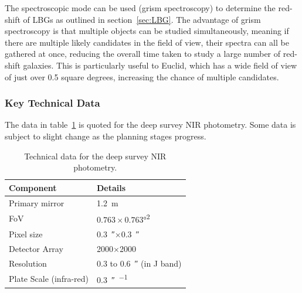 		The spectroscopic mode can be used (grism spectroscopy) to determine the red-shift of LBGs as outlined in section~\ref{sec:LBG}. The advantage of grism spectroscopy is that multiple objects can be studied simultaneously, meaning if there are multiple likely candidates in the field of view, their spectra can all be gathered at once, reducing the overall time taken to study a large number of red-shift galaxies. This is particularly useful to Euclid, which has a wide field of view of just over 0.5 square degrees, increasing the chance of multiple candidates.

	\subsubsection{Key Technical Data} %
	\label{ssub:key_technical_data}
		The data in table~\ref{tab:Euclid_technical} is quoted for the deep survey NIR photometry. Some data is subject to slight change as the planning stages progress.
		\begin{table}[ht]
			\begin{center}
				\begin{tabular}{l|l}
					Component & Details \\
					\hline\hline
					Primary mirror		& \SI{1.2}{\metre} \\ \hline
					FoV 				& $0.763\times0.763$\si{\degree\squared} \\ \hline
					Pixel size			& \SI{0.3}{\arcsecond}$\times$\SI{0.3}{\arcsecond} \\ \hline
					Detector Array		& \num{2000}$\times$\num{2000}\,\si{\pixel} \\ \hline
					Resolution 			& 0.3 to \SI{0.6}{\arcsecond} (in J band) \\ \hline
					Plate Scale (infra-red)	& \SI{0.3}{\arcsecond\per\pixel}
				\end{tabular}
			\end{center}
			\caption{Technical data for the deep survey NIR photometry\cite{Euclid_Definition_Study_Report}.\label{tab:Euclid_technical}}
		\end{table}
